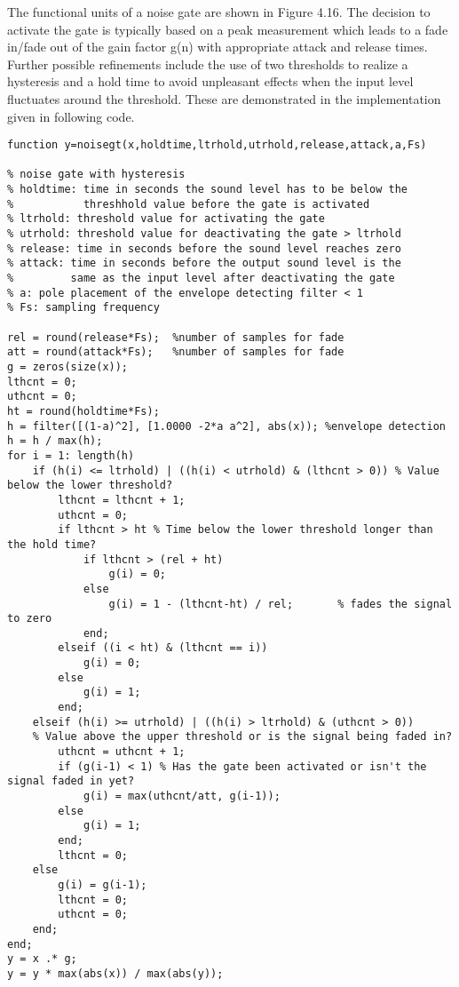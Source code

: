 \documentclass[10pt,a4paper,oneside]{article}
\begin{document}
The functional units of a noise gate are shown in Figure 4.16. The decision to activate the gate is typically based on a peak measurement which leads to a fade in/fade out of the gain factor g(n) with appropriate attack and release times. Further possible refinements include the use of two thresholds to realize a hysteresis and a hold time to avoid unpleasant effects when the input level fluctuates around the threshold. These are demonstrated in the implementation given in following code.
\begin{lstlisting}
function y=noisegt(x,holdtime,ltrhold,utrhold,release,attack,a,Fs)

% noise gate with hysteresis
% holdtime: time in seconds the sound level has to be below the 
%		    threshhold value before the gate is activated
% ltrhold: threshold value for activating the gate
% utrhold: threshold value for deactivating the gate > ltrhold
% release: time in seconds before the sound level reaches zero
% attack: time in seconds before the output sound level is the 
%		  same as the input level after deactivating the gate
% a: pole placement of the envelope detecting filter < 1
% Fs: sampling frequency

rel = round(release*Fs);  %number of samples for fade 
att = round(attack*Fs);   %number of samples for fade 
g = zeros(size(x));
lthcnt = 0;
uthcnt = 0;
ht = round(holdtime*Fs);
h = filter([(1-a)^2], [1.0000 -2*a a^2], abs(x)); %envelope detection 
h = h / max(h);
for i = 1: length(h)
	if (h(i) <= ltrhold) | ((h(i) < utrhold) & (lthcnt > 0)) % Value below the lower threshold?
		lthcnt = lthcnt + 1;		
		uthcnt = 0;
		if lthcnt > ht % Time below the lower threshold longer than the hold time?
			if lthcnt > (rel + ht) 
				g(i) = 0;
			else
				g(i) = 1 - (lthcnt-ht) / rel;		% fades the signal to zero
			end;
		elseif ((i < ht) & (lthcnt == i))
			g(i) = 0;
		else
			g(i) = 1;
		end;
	elseif (h(i) >= utrhold) | ((h(i) > ltrhold) & (uthcnt > 0))	
	% Value above the upper threshold or is the signal being faded in?
		uthcnt = uthcnt + 1;
		if (g(i-1) < 1) % Has the gate been activated or isn't the signal faded in yet?
			g(i) = max(uthcnt/att, g(i-1));
		else
			g(i) = 1;
		end;
		lthcnt = 0;
	else
		g(i) = g(i-1);
		lthcnt = 0;
		uthcnt = 0;
	end; 
end;
y = x .* g;
y = y * max(abs(x)) / max(abs(y));

\end{lstlisting}
\end{document}
